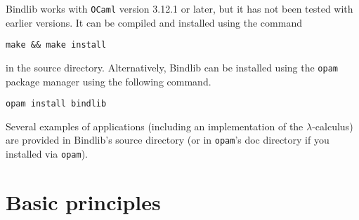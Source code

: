 \documentclass[11pt]{article}
\begin{document}
Bindlib works with \verb#OCaml# version 3.12.1 or later, but it has not been
tested with earlier versions. It can be compiled and installed using the
command
\begin{center}
  \verb#make && make install#
\end{center}
in the source directory. Alternatively, Bindlib can be installed using the
\verb#opam# package manager using the following command.
\begin{center}
  \verb#opam install bindlib#
\end{center}

Several examples of applications (including an implementation of the
$\lambda$-calculus) are provided in Bindlib's source directory (or in
\verb#opam#'s doc directory if you installed via \verb#opam#).

\section{Basic principles}
\end{document}
